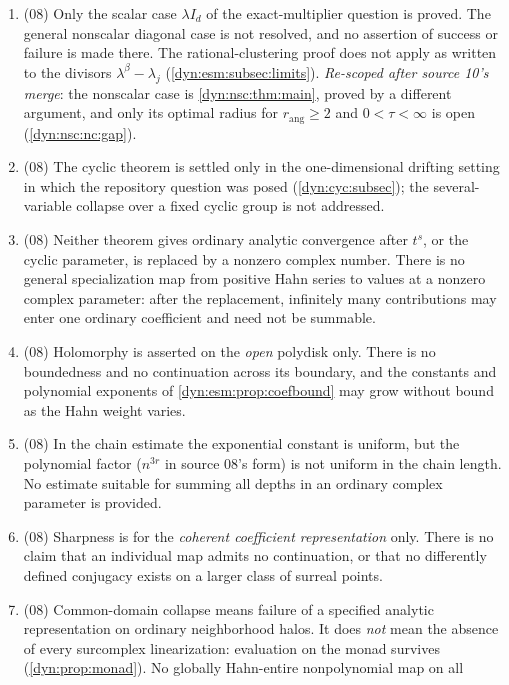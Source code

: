 \documentclass[11pt,letterpaper]{article}
\theoremstyle{definition}
\theoremstyle{remark}
\newcommand{\rang}{r_{\mathrm{ang}}}
\numberwithin{equation}{section}
\begin{document}
\begin{enumerate}[label=\textbf{N\arabic*.},ref=\textbf{N\arabic*},leftmargin=3.2em,start=81]
\item\label{dyn:esm:nc:scalar} (08) Only the scalar case $\lambda I_d$ of
the exact-multiplier question is proved. The general nonscalar diagonal case
is not resolved, and no assertion of success or failure is made there. The
rational-clustering proof does not apply as written to the divisors
$\lambda^{\beta}-\lambda_j$ (\cref{dyn:esm:subsec:limits}). \emph{Re-scoped
after source 10's merge}: the nonscalar case is \cref{dyn:nsc:thm:main},
proved by a different argument, and only its optimal radius for $\rang\ge2$
and $0<\tau<\infty$ is open (\ref{dyn:nsc:nc:gap}).
\item (08) The cyclic theorem is settled only in the one-dimensional drifting
setting in which the repository question was posed
(\cref{dyn:cyc:subsec}); the several-variable collapse over a fixed cyclic
group is not addressed.
\item\label{dyn:esm:nc:specialize} (08) Neither theorem gives ordinary
analytic convergence after $t^{s}$, or the cyclic parameter, is replaced by
a nonzero complex number. There is no general specialization map from
positive Hahn series to values at a nonzero complex parameter: after the
replacement, infinitely many contributions may enter one ordinary
coefficient and need not be summable.
\item (08) Holomorphy is asserted on the \emph{open} polydisk only. There is
no boundedness and no continuation across its boundary, and the constants
and polynomial exponents of \cref{dyn:esm:prop:coefbound} may grow without
bound as the Hahn weight varies.
\item (08) In the chain estimate the exponential constant is uniform, but
the polynomial factor ($n^{3r}$ in source 08's form) is not uniform in the
chain length. No estimate suitable for summing all depths in an ordinary
complex parameter is provided.
\item (08) Sharpness is for the \emph{coherent coefficient representation}
only. There is no claim that an individual map admits no continuation, or
that no differently defined conjugacy exists on a larger class of surreal
points.
\item (08) Common-domain collapse means failure of a specified analytic
representation on ordinary neighborhood halos. It does \emph{not} mean the
absence of every surcomplex linearization: evaluation on the monad survives
(\cref{dyn:prop:monad}). No globally Hahn-entire nonpolynomial map on all

\end{enumerate}
\end{document}
